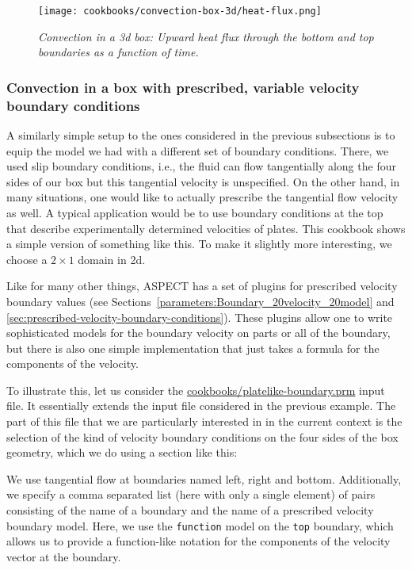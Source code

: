 \documentclass{article}
\newcommand{\aspect}{\textsc{ASPECT}}
\begin{document}
\begin{figure}
  \centering
  \texttt{[image: cookbooks/convection-box-3d/heat-flux.png]}
  \caption{\it Convection in a 3d box: Upward heat flux through the bottom and
  top boundaries as a function of time.}
  \label{fig:box-3d-heat-flux}
\end{figure}

\subsubsection{Convection in a box with prescribed, variable velocity boundary conditions}
\label{sec:cookbooks-platelike}

A similarly simple setup to the ones considered in the previous subsections is
to equip the model we had with a different set of boundary conditions. There, we used slip boundary
conditions, i.e., the fluid can flow tangentially along the four sides of our
box but this tangential velocity is unspecified. On the other hand, in many
situations, one would like to actually prescribe the tangential flow velocity as
well. A typical application would be to use boundary conditions at the top that
describe experimentally determined velocities of plates. This cookbook shows a
simple version of something like this. To make it slightly more interesting, we
choose a $2\times 1$ domain in 2d.

Like for many other things, \aspect{} has a set of plugins for prescribed
velocity boundary values (see
Sections~\ref{parameters:Boundary_20velocity_20model} and
\ref{sec:prescribed-velocity-boundary-conditions}). These plugins allow one to
write sophisticated models for the boundary velocity on parts or all of the
boundary, but there is also one simple implementation that just takes a formula
for the components of the velocity.

To illustrate this, let us consider the \url{cookbooks/platelike-boundary.prm}
input file. It essentially extends the input file considered in the previous example.
The part of this file that we are particularly interested in in the current
context is the selection of the kind of velocity boundary conditions on the four
sides of the box geometry, which we do using a section like this:


We use tangential flow at boundaries named left, right and bottom.
Additionally, we specify a comma separated list (here with only a single
element) of pairs consisting of the name of a boundary and the name of a
prescribed velocity boundary model. Here, we use the \texttt{function} model on
the \texttt{top} boundary, which allows us to provide a function-like notation
for the components of the velocity vector at the boundary.
\end{document}
